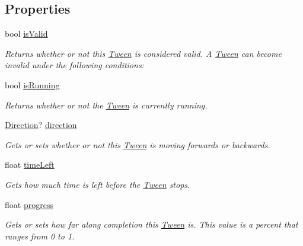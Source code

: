 \subsection*{Properties}
\begin{DoxyCompactItemize}
\item 
bool \mbox{\hyperlink{struct_leap_1_1_unity_1_1_animation_1_1_tween_a9a3bab65cf734fb04f4c7c7525719891}{is\+Valid}}
\begin{DoxyCompactList}\small\item\em Returns whether or not this \mbox{\hyperlink{struct_leap_1_1_unity_1_1_animation_1_1_tween}{Tween}} is considered valid. A \mbox{\hyperlink{struct_leap_1_1_unity_1_1_animation_1_1_tween}{Tween}} can become invalid under the following conditions\+: \end{DoxyCompactList}\item 
bool \mbox{\hyperlink{struct_leap_1_1_unity_1_1_animation_1_1_tween_a0af0e03e8197661737ace80ef03636c6}{is\+Running}}
\begin{DoxyCompactList}\small\item\em Returns whether or not the \mbox{\hyperlink{struct_leap_1_1_unity_1_1_animation_1_1_tween}{Tween}} is currently running. \end{DoxyCompactList}\item 
\mbox{\hyperlink{namespace_leap_1_1_unity_1_1_animation_ab080d4756e4d3d6a2fc9cd9a7f4e695a}{Direction}}? \mbox{\hyperlink{struct_leap_1_1_unity_1_1_animation_1_1_tween_ae88d2317428932c7de52a00298005696}{direction}}
\begin{DoxyCompactList}\small\item\em Gets or sets whether or not this \mbox{\hyperlink{struct_leap_1_1_unity_1_1_animation_1_1_tween}{Tween}} is moving forwards or backwards. \end{DoxyCompactList}\item 
float \mbox{\hyperlink{struct_leap_1_1_unity_1_1_animation_1_1_tween_a27ebf28615fd4bfe76cf8c9eb2bd3379}{time\+Left}}
\begin{DoxyCompactList}\small\item\em Gets how much time is left before the \mbox{\hyperlink{struct_leap_1_1_unity_1_1_animation_1_1_tween}{Tween}} stops. \end{DoxyCompactList}\item 
float \mbox{\hyperlink{struct_leap_1_1_unity_1_1_animation_1_1_tween_ae0123854170a23519792c97c8620645c}{progress}}
\begin{DoxyCompactList}\small\item\em Gets or sets how far along completion this \mbox{\hyperlink{struct_leap_1_1_unity_1_1_animation_1_1_tween}{Tween}} is. This value is a percent that ranges from 0 to 1. \end{DoxyCompactList}\end{DoxyCompactItemize}


